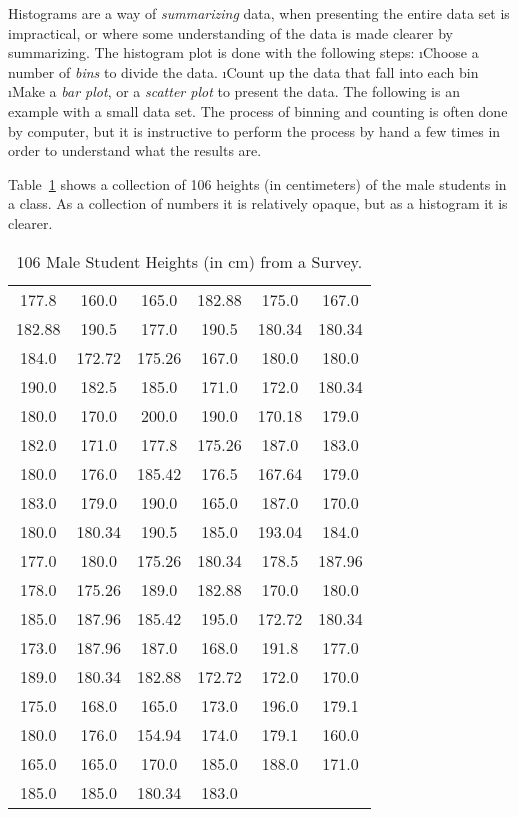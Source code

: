 Histograms are a way of {\em summarizing} data, when presenting the entire data set is impractical, or where some understanding of the data is made clearer by summarizing.  The histogram plot is done with the following steps:
\be
\i Choose a number of {\em bins} to divide the data.  
\i Count up the data that fall into each bin
\i Make a {\em bar plot}, or a {\em scatter plot} to present the data.
\ee
The following is an example with a small data set.  The process of binning and counting is often done by computer, but it is instructive to perform the process by hand a few times in order to understand what the results are.

Table~\ref{tbl:male_heights} shows a collection of 106 heights (in centimeters) of the male students in a class\cite{Arel-Bundock:2014uq}.  As a collection of numbers it is relatively opaque, but as a histogram it is clearer.

\begin{table}
\begin{center}
\begin{tabular}{cccccc}
\toprule
177.8& 160.0& 165.0& 182.88& 175.0& 167.0\\
182.88& 190.5& 177.0& 190.5& 180.34& 180.34\\
184.0& 172.72& 175.26& 167.0& 180.0& 180.0\\
190.0& 182.5& 185.0& 171.0& 172.0& 180.34\\
180.0& 170.0& 200.0& 190.0& 170.18& 179.0\\
182.0& 171.0& 177.8& 175.26& 187.0& 183.0\\
180.0& 176.0& 185.42& 176.5& 167.64& 179.0\\
183.0& 179.0& 190.0& 165.0& 187.0& 170.0\\
180.0& 180.34& 190.5& 185.0& 193.04& 184.0\\
177.0& 180.0& 175.26& 180.34& 178.5& 187.96\\
178.0& 175.26& 189.0& 182.88& 170.0& 180.0\\
185.0& 187.96& 185.42& 195.0& 172.72& 180.34\\
173.0& 187.96& 187.0& 168.0& 191.8& 177.0\\
189.0& 180.34& 182.88& 172.72& 172.0& 170.0\\
175.0& 168.0& 165.0& 173.0& 196.0& 179.1\\
180.0& 176.0& 154.94& 174.0& 179.1& 160.0\\
165.0& 165.0& 170.0& 185.0& 188.0& 171.0\\
185.0& 185.0& 180.34&183.0&  &\\
\bottomrule
\end{tabular}
\end{center}
\caption{106 Male Student Heights (in cm) from a Survey.}
\label{tbl:male_heights}
\end{table}

